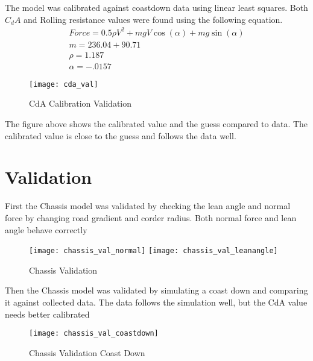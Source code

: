 \documentclass[../SimBALink.tex]{subfiles}
\begin{document}
The model was calibrated against coastdown data using linear least squares. Both $C_dA$ and Rolling resistance values were found using the following equation.
\begin{gather}
	Force = 0.5\rho V^2 + mgV\cos(\alpha) + mg\sin(\alpha) \\
	m = 236.04 + 90.71 \\
	\rho = 1.187 \\
	\alpha = -.0157
\end{gather}

\begin{figure}[H]
  \centering
  \texttt{[image: cda\_val]}
  \caption{CdA Calibration Validation}
\end{figure}

The figure above shows the calibrated value and the guess compared to data. The calibrated value is close to the guess and follows the data well.



\section{Validation}

First the Chassis model was validated by checking the lean angle and normal force by changing road gradient and corder radius. Both normal force and lean angle behave correctly

\begin{figure}[H]
\center
  \texttt{[image: chassis\_val\_normal]}
  \texttt{[image: chassis\_val\_leanangle]}
  \caption{Chassis Validation}
\end{figure}

Then the Chassis model was validated by simulating a coast down and comparing it against collected data. The data follows the simulation well, but the CdA value needs better calibrated

\begin{figure}[H]
\center
 \texttt{[image: chassis\_val\_coastdown]}
  \caption{Chassis Validation Coast Down}
\end{figure}
\end{document}
